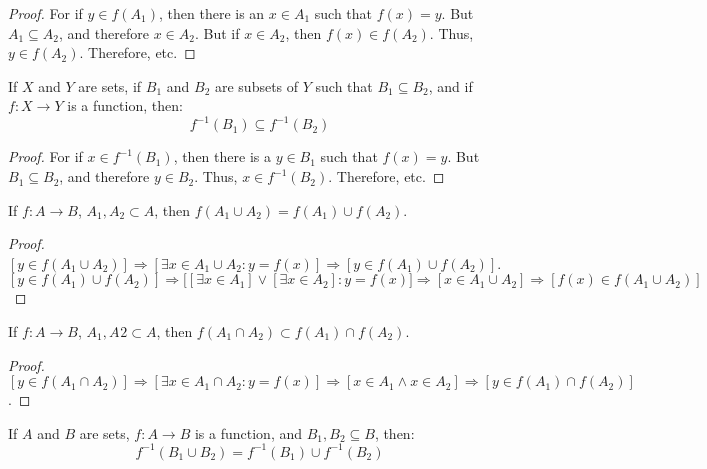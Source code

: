     \begin{proof}
        For if $y\in{f}(A_{1})$, then there is an $x\in{A}_{1}$
        such that $f(x)=y$. But $A_{1}\subseteq{A}_{2}$, and
        therefore $x\in{A}_{2}$. But if $x\in{A}_{2}$, then
        $f(x)\in{f}(A_{2})$. Thus, $y\in{f}(A_{2})$. Therefore, etc.
    \end{proof}
    \begin{theorem}
        If $X$ and $Y$ are sets, if $B_{1}$ and $B_{2}$ are subsets of
        $Y$ such that $B_{1}\subseteq{B}_{2}$, and if $f:X\rightarrow{Y}$
        is a function, then:
        \begin{equation}
            f^{-1}(B_{1})\subseteq{f^{-1}}(B_{2})
        \end{equation}
    \end{theorem}
    \begin{proof}
        For if $x\in{f}^{-1}(B_{1})$, then there is a
        $y\in{B}_{1}$ such that $f(x)=y$. But
        $B_{1}\subseteq{B}_{2}$, and therefore $y\in{B}_{2}$.
        Thus, $x\in{f}^{-1}(B_{2})$. Therefore, etc.
    \end{proof}
    \begin{theorem}
    If $f:A\rightarrow B$, $A_1,A_2\subset A$, then $f(A_1 \cup A_2) = f(A_1)\cup f(A_2)$.
    \end{theorem}
    \begin{proof}
    $[y\in f(A_1\cup A_2)]\Rightarrow [\exists x\in A_1 \cup A_2:y=f(x)]\Rightarrow [y \in f(A_1)\cup f(A_2)]$. $[y\in f(A_1)\cup f(A_2)]\Rightarrow \big[[\exists x\in A_1] \lor[\exists x\in A_2]: y=f(x)\big]\Rightarrow [x\in A_1\cup A_2]\Rightarrow [f(x)\in f(A_1\cup A_2)]$
    \end{proof}
    \begin{theorem}
        If $f:A\rightarrow B$, $A_{1},A_{}2\subset A$, then
        $f(A_{1}\cap{A}_{2})\subset{f}(A_{1})\cap{f}(A_{2})$.
    \end{theorem}
    \begin{proof}
        $[y\in f(A_1 \cap A_2)]\Rightarrow [\exists x\in A_1 \cap A_2:y=f(x)]\Rightarrow [x\in A_1 \land x \in A_2] \Rightarrow[y \in f(A_1)\cap f(A_2)]$.
    \end{proof}
    \begin{theorem}
        If $A$ and $B$ are sets, $f:A\rightarrow{B}$ is a function,
        and $B_{1},B_{2}\subseteq{B}$, then:
        \begin{equation}
            f^{-1}(B_{1}\cup{B}_{2})=f^{-1}(B_{1})\cup{f}^{-1}(B_{2})
        \end{equation}
    \end{theorem}
